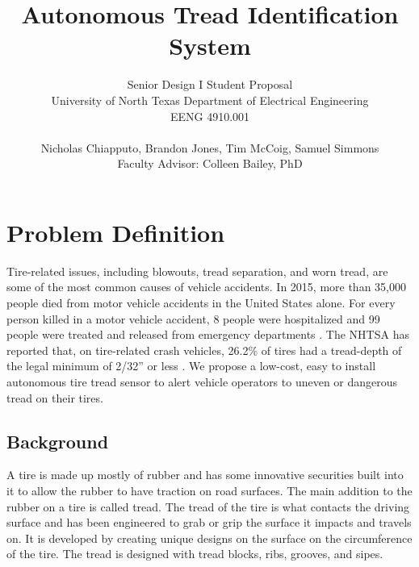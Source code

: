 \documentclass[11pt]{IEEEtran}
\begin{document}
	\title{ Autonomous Tread Identification System }

	\author{	Senior Design I Student Proposal \\
				University of North Texas Department of Electrical Engineering \\
				EENG 4910.001 \\ \\
				Nicholas Chiapputo, Brandon Jones, Tim McCoig, Samuel Simmons \\
				Faculty Advisor: Colleen Bailey, PhD
	}

	\maketitle


	\section{Problem Definition}
		Tire-related issues, including blowouts, tread separation, and worn tread, are some of the most common causes of vehicle accidents. In 2015, more than 35,000 people died from motor vehicle accidents in the United States alone. For every person killed in a motor vehicle accident, 8 people were hospitalized and 99 people were treated and released from emergency departments \cite{cdcKeyStats}. The NHTSA has reported that, on tire-related crash vehicles, 26.2\% of tires had a tread-depth of the legal minimum of 2/32'' or less \cite[pp.~8-9]{nhtsaCrashStats}. We propose a low-cost, easy to install autonomous tire tread sensor to alert vehicle operators to uneven or dangerous tread on their tires.

		\subsection{Background}
			A tire is made up mostly of rubber and has some innovative securities built into it to allow the rubber to have traction on road surfaces. The main addition to the rubber on a tire is called tread. The tread of the tire is what contacts the driving surface and has been engineered to grab or grip the surface it impacts and travels on. It is developed by creating unique designs on the surface on the circumference of the tire. The tread is designed with tread blocks, ribs, grooves, and sipes.
\end{document}
